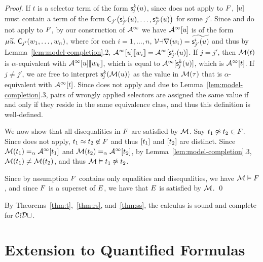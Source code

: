 \begin{proof}
If $t$ is a selector term of the form $\textsf{s}^k_{\kern-0.083333em j}( u )$,
since  does not apply to $F$,
$[u]$ must contain a term of the form $\textsf{C}_{j'}\bigl( \textsf{s}^1_{j'}( u ), \ldots, \textsf{s}^{n}_{j'}( u ) \bigr)$ for some $j'$.
Since  and  do not apply to $F$, 
by our construction of $\mathcal{A}^\infty$ we have $\mathcal{A}^\infty [u]$ is of the form
$\MU {\Varec{u}}.\; \const C_{j'}( w_1, \ldots, w_n )$,
where for each $i = 1, \ldots, n$,
$\mathcal{Var}(w_i) = {\widetilde{\textsf{s}^i_{j'}( u )}}$ and thus by Lemma~\ref{lem:model-completion}.2, 
$\mathcal{A}^\infty [u] \llbracket  w_i  \rrbracket = \mathcal{A}^\infty [ \textsf{s}^i_{j'}( u )]$. 
If $j = j'$, then $\mathcal{M}( t )$ is $\alpha$-equivalent with $\mathcal{A}^\infty [u] \llbracket w_k \rrbracket$, which is equal to $\mathcal{A}^\infty [ \textsf{s}^k_{\kern-0.083333em j}( u )]$,
which is $\mathcal{A}^\infty [t]$.
If $j \neq j'$, we are free to interpret $\textsf{s}^k_{\kern-0.083333em j}( \mathcal{M}( u ) )$ as the value in $\mathcal{M}( \tau )$ that is $\alpha$-equivalent with $\mathcal{A}^\infty [ t ]$.
Since  does not apply and due to Lemma~\ref{lem:model-completion}.3,
pairs of wrongly applied selectors are assigned the same value if and only if they reside in the same equivalence class,
and thus this definition is well-defined.

We now show that all disequalities in $F$ are satisfied by $\mathcal{M}$.
Say $t_1 \not\approx t_2 \in F$.
Since  does not apply, $t_1 \approx t_2 \not\in F$ and thus $[t_1]$ and $[t_2]$ are distinct.
Since $\mathcal{M}( t_1 ) \mathrel{=_\alpha} \mathcal{A}^\infty [t_1]$ and $\mathcal{M}( t_2 ) \mathrel{=_\alpha} \mathcal{A}^\infty [t_2]$,
by Lemma~\ref{lem:model-completion}.3, $\mathcal{M}( t_1 ) \neq \mathcal{M}( t_2 )$, and thus $\mathcal{M} \vDash t_1 \not\approx t_2$.

Since by assumption $F$ contains only equalities and disequalities, we have $\mathcal{M} \vDash F$,
and since $F$ is a superset of $E$, we have that $E$ is satisfied by $\mathcal{M}$.
\qed
\end{proof}

By Theorems~\ref{thm:t},~\ref{thm:rs}, and~\ref{thm:ss}, the calculus is sound and complete for $\mathcal{CoDt}$.

\section{Extension to Quantified Formulas}
\label{sec:extension-to-quantified-formulas}

